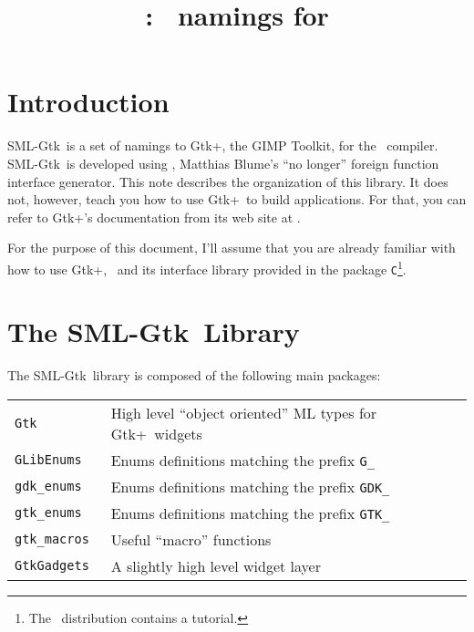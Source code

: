 \documentclass{article}
\title{\large \smlgtk: \gtk\ namings for \smlnj}
\newcommand{\gtk}{\mbox{\sf Gtk+}}
\newcommand{\smlgtk}{\mbox{\sf SML-Gtk}}
\begin{document}
    \maketitle

\section{Introduction}
    \smlgtk\ is a set of namings to \gtk, the GIMP Toolkit,
for the \smlnj\ compiler. 
\smlgtk\ is developed using \mlnlffigen\cite{c-glue-maker}, 
Matthias Blume's ``no longer''
foreign function interface generator.
This note describes the organization of this library.  It does not,
however, teach you how to use \gtk\ to build applications.
For that, you can refer to \gtk's documentation from its web site
at .

    For the purpose of this document, I'll assume that you are already
familiar with how to use \gtk, \mlnlffigen\ and its interface library
provided in the package \verb|C|\footnote{The
\mlnlffigen\ distribution contains a tutorial.}.

\section{The \smlgtk\ Library}

   The \smlgtk\ library is composed of the following main packages:
\begin{center}
  \begin{tabular}{|l|l|} \hline
   \tt Gtk          & High level ``object oriented'' 
                      ML types for \gtk\ widgets \\
   \tt GLibEnums    & Enums definitions matching the prefix {\tt G\_}  \\
   \tt gdk_enums     & Enums definitions matching the prefix {\tt GDK\_} \\
   \tt gtk_enums     & Enums definitions matching the prefix {\tt GTK\_} \\
   \tt gtk_macros    & Useful ``macro'' functions \\
   \tt GtkGadgets   & A slightly high level widget layer \\
  \hline
  \end{tabular}
\end{center}
\end{document}
